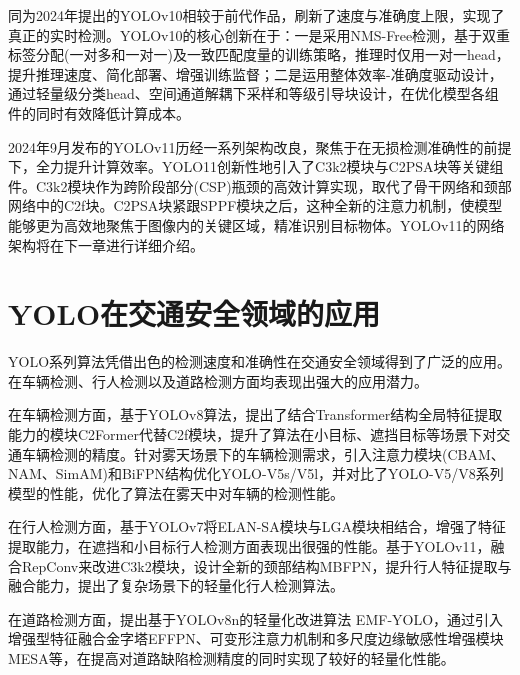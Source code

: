 同为2024年提出的YOLOv10相较于前代作品，刷新了速度与准确度上限，实现了真正的实时检测\cite{yolov10}。YOLOv10的核心创新在于：一是采用NMS-Free检测，基于双重标签分配(一对多和一对一)及一致匹配度量的训练策略，推理时仅用一对一head，提升推理速度、简化部署、增强训练监督；二是运用整体效率-准确度驱动设计，通过轻量级分类head、空间通道解耦下采样和等级引导块设计，在优化模型各组件的同时有效降低计算成本。

2024年9月发布的YOLOv11历经一系列架构改良，聚焦于在无损检测准确性的前提下，全力提升计算效率。YOLO11创新性地引入了C3k2模块与C2PSA块等关键组件。C3k2模块作为跨阶段部分(CSP)瓶颈的高效计算实现，取代了骨干网络和颈部网络中的C2f块。C2PSA块紧跟SPPF模块之后，这种全新的注意力机制，使模型能够更为高效地聚焦于图像内的关键区域，精准识别目标物体。YOLOv11的网络架构将在下一章进行详细介绍。





\section{YOLO在交通安全领域的应用}
YOLO系列算法凭借出色的检测速度和准确性在交通安全领域得到了广泛的应用。在车辆检测、行人检测以及道路检测方面均表现出强大的应用潜力。

在车辆检测方面，\textcite{ex1}基于YOLOv8算法，提出了结合Transformer结构全局特征提取能力的模块C2Former代替C2f模块，提升了算法在小目标、遮挡目标等场景下对交通车辆检测的精度。\textcite{ex2}针对雾天场景下的车辆检测需求，引入注意力模块(CBAM、NAM、SimAM)和BiFPN结构优化YOLO-V5s/V5l，并对比了YOLO-V5/V8系列模型的性能，优化了算法在雾天中对车辆的检测性能。

在行人检测方面，\textcite{ex3}基于YOLOv7将ELAN-SA模块与LGA模块相结合，增强了特征提取能力，在遮挡和小目标行人检测方面表现出很强的性能。\textcite{ex4}基于YOLOv11，融合RepConv来改进C3k2模块，设计全新的颈部结构MBFPN，提升行人特征提取与融合能力，提出了复杂场景下的轻量化行人检测算法。

在道路检测方面，\textcite{ex5}提出基于YOLOv8n的轻量化改进算法 EMF-YOLO，通过引入增强型特征融合金字塔EFFPN、可变形注意力机制和多尺度边缘敏感性增强模块MESA等，在提高对道路缺陷检测精度的同时实现了较好的轻量化性能。 

